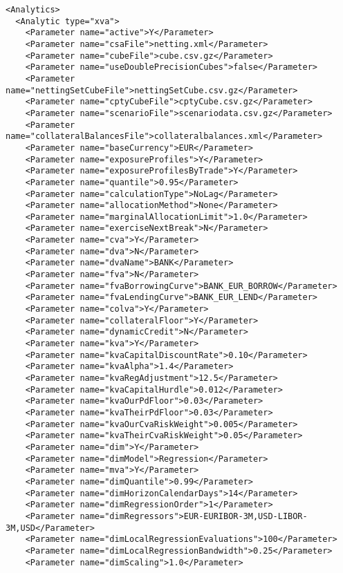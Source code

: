 {\begin{listing}[H]
\begin{verbatim}
<Analytics>
  <Analytic type="xva">
    <Parameter name="active">Y</Parameter>
    <Parameter name="csaFile">netting.xml</Parameter>
    <Parameter name="cubeFile">cube.csv.gz</Parameter>
    <Parameter name="useDoublePrecisionCubes">false</Parameter>
    <Parameter name="nettingSetCubeFile">nettingSetCube.csv.gz</Parameter>
    <Parameter name="cptyCubeFile">cptyCube.csv.gz</Parameter>
    <Parameter name="scenarioFile">scenariodata.csv.gz</Parameter>
    <Parameter name="collateralBalancesFile">collateralbalances.xml</Parameter>
    <Parameter name="baseCurrency">EUR</Parameter>
    <Parameter name="exposureProfiles">Y</Parameter>
    <Parameter name="exposureProfilesByTrade">Y</Parameter>
    <Parameter name="quantile">0.95</Parameter>
    <Parameter name="calculationType">NoLag</Parameter>      
    <Parameter name="allocationMethod">None</Parameter>    
    <Parameter name="marginalAllocationLimit">1.0</Parameter>
    <Parameter name="exerciseNextBreak">N</Parameter>
    <Parameter name="cva">Y</Parameter>
    <Parameter name="dva">N</Parameter>
    <Parameter name="dvaName">BANK</Parameter>
    <Parameter name="fva">N</Parameter>
    <Parameter name="fvaBorrowingCurve">BANK_EUR_BORROW</Parameter>
    <Parameter name="fvaLendingCurve">BANK_EUR_LEND</Parameter>
    <Parameter name="colva">Y</Parameter>
    <Parameter name="collateralFloor">Y</Parameter>
    <Parameter name="dynamicCredit">N</Parameter>
    <Parameter name="kva">Y</Parameter>
    <Parameter name="kvaCapitalDiscountRate">0.10</Parameter>
    <Parameter name="kvaAlpha">1.4</Parameter>
    <Parameter name="kvaRegAdjustment">12.5</Parameter>
    <Parameter name="kvaCapitalHurdle">0.012</Parameter>
    <Parameter name="kvaOurPdFloor">0.03</Parameter>
    <Parameter name="kvaTheirPdFloor">0.03</Parameter>
    <Parameter name="kvaOurCvaRiskWeight">0.005</Parameter>
    <Parameter name="kvaTheirCvaRiskWeight">0.05</Parameter>
    <Parameter name="dim">Y</Parameter>
    <Parameter name="dimModel">Regression</Parameter>
    <Parameter name="mva">Y</Parameter>
    <Parameter name="dimQuantile">0.99</Parameter>
    <Parameter name="dimHorizonCalendarDays">14</Parameter>
    <Parameter name="dimRegressionOrder">1</Parameter>
    <Parameter name="dimRegressors">EUR-EURIBOR-3M,USD-LIBOR-3M,USD</Parameter>
    <Parameter name="dimLocalRegressionEvaluations">100</Parameter>
    <Parameter name="dimLocalRegressionBandwidth">0.25</Parameter>
    <Parameter name="dimScaling">1.0</Parameter>

\end{verbatim}
\end{listing}}
